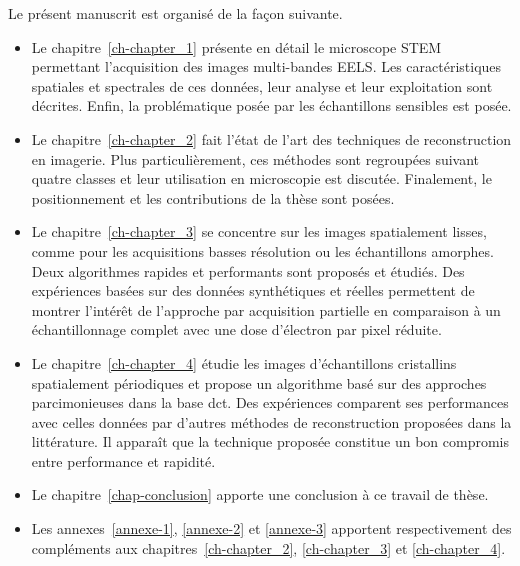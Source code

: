 Le présent manuscrit est organisé de la façon suivante.
\begin{itemize}
    \item Le chapitre~\ref{ch-chapter_1} présente en détail le microscope STEM permettant l'acquisition des images multi-bandes EELS. Les caractéristiques spatiales et spectrales de ces données, leur analyse et leur exploitation sont décrites. Enfin, la problématique posée par les échantillons sensibles  est posée.
    \item Le chapitre~\ref{ch-chapter_2} fait l'état de l'art des techniques de reconstruction en imagerie. Plus particulièrement, ces méthodes sont regroupées suivant quatre classes et leur utilisation en microscopie est discutée. Finalement, le positionnement et les contributions de la thèse sont posées.
    \item Le chapitre~\ref{ch-chapter_3} se concentre sur les images spatialement lisses, comme pour les acquisitions basses résolution ou les échantillons amorphes. Deux algorithmes rapides et performants sont proposés et étudiés. Des expériences basées sur des données synthétiques et réelles permettent de montrer l'intérêt de l'approche par acquisition partielle en comparaison à un échantillonnage complet avec une dose d'électron par pixel réduite.
    \item Le chapitre~\ref{ch-chapter_4} étudie les images d'échantillons cristallins spatialement périodiques et propose un algorithme basé sur des approches parcimonieuses dans la base \gls{dct}. Des expériences comparent ses performances avec celles données par d'autres méthodes de reconstruction proposées dans la littérature. Il apparaît que la technique proposée constitue un bon compromis entre performance et rapidité.
    \item Le chapitre~\ref{chap-conclusion} apporte une conclusion à ce travail de thèse.
    \item Les annexes~\ref{annexe-1}, \ref{annexe-2} et \ref{annexe-3} apportent respectivement des compléments aux chapitres~\ref{ch-chapter_2}, \ref{ch-chapter_3} et \ref{ch-chapter_4}.
\end{itemize} 
 
 
 
 





